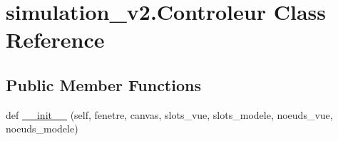 \hypertarget{classsimulation__v2_1_1Controleur}{}\section{simulation\+\_\+v2.\+Controleur Class Reference}
\label{classsimulation__v2_1_1Controleur}
\subsection*{Public Member Functions}
\begin{DoxyCompactItemize}
\item 
def \hyperlink{classsimulation__v2_1_1Controleur_a76cc4b954f4e8e08491ea2cd80d1b60c}{\+\_\+\+\_\+init\+\_\+\+\_\+} (self, fenetre, canvas, slots\+\_\+vue, slots\+\_\+modele, noeuds\+\_\+vue, noeuds\+\_\+modele)
\end{DoxyCompactItemize}
